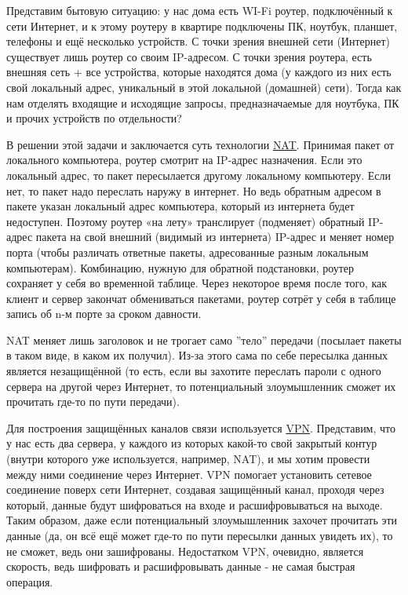 Представим бытовую ситуацию: у нас дома есть WI-Fi роутер, подключённый к сети Интернет, и к этому роутеру в квартире подключены ПК, ноутбук, планшет, телефоны и ещё несколько устройств. С точки зрения внешней сети (Интернет) существует лишь роутер со своим IP-адресом. С точки зрения роутера, есть внешняя сеть + все устройства, которые находятся дома (у каждого из них есть свой локальный адрес, уникальный в этой локальной (домашней) сети). Тогда как нам отделять входящие и исходящие запросы, предназначаемые для ноутбука, ПК и прочих устройств по отдельности?

В решении этой задачи и заключается суть технологии \href{https://ru.wikipedia.org/wiki/NAT}{NAT}. Принимая пакет от локального компьютера, роутер смотрит на IP-адрес назначения. Если это локальный адрес, то пакет пересылается другому локальному компьютеру. Если нет, то пакет надо переслать наружу в интернет. Но ведь обратным адресом в пакете указан локальный адрес компьютера, который из интернета будет недоступен. Поэтому роутер «на лету» транслирует (подменяет) обратный IP-адрес пакета на свой внешний (видимый из интернета) IP-адрес и меняет номер порта (чтобы различать ответные пакеты, адресованные разным локальным компьютерам). Комбинацию, нужную для обратной подстановки, роутер сохраняет у себя во временной таблице. Через некоторое время после того, как клиент и сервер закончат обмениваться пакетами, роутер сотрёт у себя в таблице запись об n-м порте за сроком давности.

NAT меняет лишь заголовок и не трогает само ''тело'' передачи (посылает пакеты в таком виде, в каком их получил). Из-за этого сама по себе пересылка данных является незащищённой (то есть, если вы захотите переслать пароли с одного сервера на другой через Интернет, то потенциальный злоумышленник сможет их прочитать где-то по пути передачи).

\bigskip    
Для построения защищённых каналов связи используется \href{https://ru.wikipedia.org/wiki/VPN}{VPN}. Представим, что у нас есть два сервера, у каждого из которых какой-то свой закрытый контур (внутри которого уже используется, например, NAT), и мы хотим провести между ними соединение через Интернет. VPN помогает установить сетевое соединение поверх сети Интернет, создавая защищённый канал, проходя через который, данные будут шифроваться на входе и расшифровываться на выходе.
Таким образом, даже если потенциальный злоумышленник захочет прочитать эти данные (да, он всё ещё может где-то по пути пересылки данных увидеть их), то не сможет, ведь они зашифрованы. Недостатком VPN, очевидно, является скорость, ведь шифровать и расшифровывать данные - не самая быстрая операция.